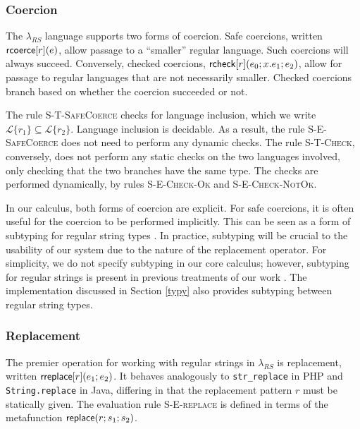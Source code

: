 \documentclass[10pt]{sigplanconf}
\theoremstyle{definition}
\newcommand{\Lagr}{\mathcal{L}}
\newcommand{\lang}[1]{\Lagr\{#1\}}
\newcommand{\lambdas}{\lambda_{RS}}
\newcommand{\sisubst}[3]{{\sf rreplace}[#1](#2;#3)} \newcommand{\rreplace}[3]{{\sf rreplace}[#1](#2;#3)} %
\newcommand{\rcoerce}[2]{{\sf rcoerce}[#1](#2)}
\newcommand{\rcheck}[4]{ {\sf rcheck}[#1](#2;#3;#4) }
\newcommand{\lsubst}[3]{{\sf replace}(#1;#2;#3)} %
\begin{document}
\subsubsection{Coercion}

The $\lambdas$ language supports two forms of coercion. Safe coercions, written $\rcoerce{r}{e}$, allow passage to a ``smaller'' regular language. Such coercions will always succeed. 
Conversely, checked coercions, $\rcheck{r}{e_0}{x.e_1}{e_2}$, 
allow for passage to regular languages that are not necessarily smaller. Checked coercions branch based on whether the coercion succeeded or not.

The rule 
 \textsc{S-T-SafeCoerce} checks for language inclusion, which we write $\lang{r_1} \subseteq \lang{r_2}$. Language inclusion is decidable. As a result, the rule \textsc{S-E-SafeCoerce} does not need to perform any dynamic checks. The rule 
\textsc{S-T-Check}, conversely, does not perform any static checks on the two languages involved, only checking that the two branches have the same type. The checks are performed dynamically, by rules \textsc{S-E-Check-Ok} and \textsc{S-E-Check-NotOk}. 

In our calculus, both forms of coercion are explicit. For safe coercions, it is often useful for the coercion to be performed implicitly. This can be seen as a form of subtyping for regular string types \cite{gunter, fulton13, xhaskell2}. 
In practice, subtyping will be crucial to the usability of our system due to the nature of the replacement operator.
For simplicity, we do not specify subtyping in our core calculus; however, subtyping for regular strings is present in previous treatments of our work \cite{fulton13}. The implementation discussed in Section \ref{typy} also provides subtyping between regular string types.

\subsubsection{Replacement}\label{sec:replace}
The premier operation for working with regular strings in $\lambdas$ is  replacement, written $\sisubst{r}{e_1}{e_2}$. 
It behaves analogously to \lstinline{str_replace} in PHP and \lstinline{String.replace} in Java, differing in that the replacement pattern $r$ must be statically given. The evaluation rule \textsc{S-E-replace} is defined in terms of the metafunction $\lsubst{r}{s_1}{s_2}$.
\end{document}
